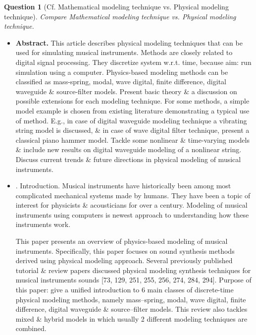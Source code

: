 \documentclass{article}
\newtheorem{question}{Question}
\begin{document}
\begin{question}[Cf. Mathematical modeling technique vs. Physical modeling technique]
	Compare Mathematical modeling technique vs. Physical modeling technique.
\end{question}

\begin{itemize}
	\item {\bf Abstract.} This article describes physical modeling techniques that can be used for simulating musical instruments. Methods are closely related to digital signal processing. They discretize system w.r.t. time, because aim: run simulation using a computer. Physics-based modeling methods can be classified as mass-spring, modal, wave digital, finite difference, digital waveguide \& source-filter models. Present basic theory \& a discussion on possible extensions for each modeling technique. For some methods, a simple model example is chosen from existing literature demonstrating a typical use of method. E.g., in case of digital waveguide modeling technique a vibrating string model is discussed, \& in case of wave digital filter technique, present a classical piano hammer model. Tackle some nonlinear \& time-varying models \& include new results on digital waveguide modeling of a nonlinear string. Discuss current trends \& future directions in physical modeling of musical instruments.
	\item {. Introduction.} Musical instruments have historically been among most complicated mechanical systems made by humans. They have been a topic of interest for physicists \& acousticians for over a century. Modeling of musical instruments using computers is newest approach to understanding how these instruments work.
	
	This paper presents an overview of physics-based modeling of musical instruments. Specifically, this paper focuses on sound synthesis methods derived using physical modeling approach. Several previously published tutorial \& review papers discussed physical modeling synthesis techniques for musical instruments sounds [73, 129, 251, 255, 256, 274, 284, 294]. Purpose of this paper: give a unified introduction to 6 main classes of discrete-time physical modeling methods, namely mass--spring, modal, wave digital, finite difference, digital waveguide \& source--filter models. This review also tackles mixed \& hybrid models in which usually 2 different modeling techniques are combined.
	

\end{itemize}
\end{document}

